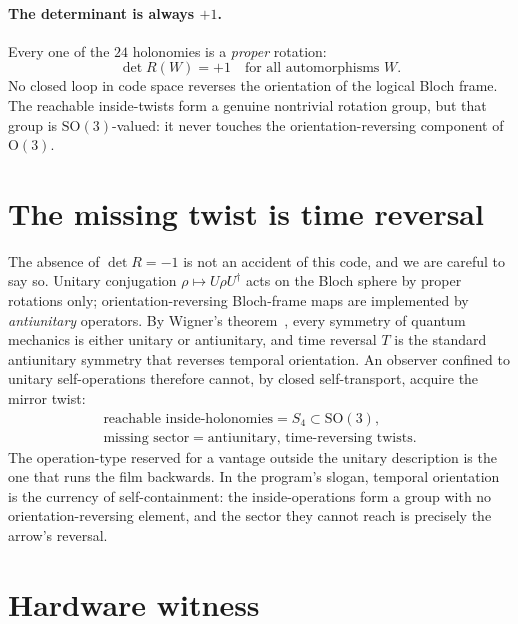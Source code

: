 \documentclass[11pt]{article}
\newcommand{\Sfour}{S_4}
\begin{document}
\paragraph{The determinant is always $+1$.} Every one of the $24$ holonomies is a
\emph{proper} rotation:
\begin{equation}
  \det R(W) = +1 \quad\text{for all automorphisms } W.
\end{equation}
No closed loop in code space reverses the orientation of the logical Bloch
frame. The reachable inside-twists form a genuine nontrivial rotation group, but
that group is $\mathrm{SO}(3)$-valued: it never touches the orientation-reversing
component of $\mathrm{O}(3)$.

\section{The missing twist is time reversal}

The absence of $\det R = -1$ is not an accident of this code, and we are careful
to say so. Unitary conjugation $\rho \mapsto U\rho U^\dagger$ acts on the Bloch
sphere by proper rotations only; orientation-reversing Bloch-frame maps are
implemented by \emph{antiunitary} operators. By Wigner's theorem~\cite{wigner},
every symmetry of quantum mechanics is either unitary or antiunitary, and time
reversal $T$ is the standard antiunitary symmetry that reverses temporal
orientation. An observer confined to unitary self-operations therefore cannot,
by closed self-transport, acquire the mirror twist:
\begin{equation}
  \boxed{
  \begin{gathered}
  \text{reachable inside-holonomies} = \Sfour \subset \mathrm{SO}(3),\\
  \text{missing sector} = \text{antiunitary, time-reversing twists}.
  \end{gathered}}
\end{equation}
The operation-type reserved for a vantage outside the unitary description is the
one that runs the film backwards. In the program's slogan, temporal orientation
is the currency of self-containment: the inside-operations form a group with no
orientation-reversing element, and the sector they cannot reach is precisely the
arrow's reversal.

\section{Hardware witness}
\end{document}
